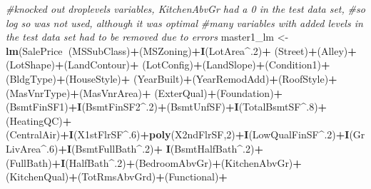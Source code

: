 \documentclass[]{article}
\newenvironment{Shaded}{\begin{snugshade}}{\end{snugshade}}
\newcommand{\CommentTok}[1]{\textcolor[rgb]{0.56,0.35,0.01}{\textit{#1}}}
\newcommand{\DecValTok}[1]{\textcolor[rgb]{0.00,0.00,0.81}{#1}}
\newcommand{\KeywordTok}[1]{\textcolor[rgb]{0.13,0.29,0.53}{\textbf{#1}}}
\newcommand{\NormalTok}[1]{#1}
\newcommand{\OperatorTok}[1]{\textcolor[rgb]{0.81,0.36,0.00}{\textbf{#1}}}
\newcommand{\StringTok}[1]{\textcolor[rgb]{0.31,0.60,0.02}{#1}}
\begin{document}
\begin{Shaded}
\begin{Highlighting}[]
\CommentTok{#knocked out droplevels variables, KitchenAbvGr had a 0 in the test data set,}
\CommentTok{#so log so was not used, although it was optimal}
\CommentTok{#many variables with added levels in the test data set had to be removed due to errors}
\NormalTok{master1_lm <-}\StringTok{ }\KeywordTok{lm}\NormalTok{(SalePrice}\OperatorTok{~}\NormalTok{(MSSubClass)}\OperatorTok{+}\NormalTok{(MSZoning)}\OperatorTok{+}\KeywordTok{I}\NormalTok{(LotArea}\OperatorTok{^}\NormalTok{.}\DecValTok{2}\NormalTok{)}\OperatorTok{+}\StringTok{ }\NormalTok{(Street)}\OperatorTok{+}\NormalTok{(Alley)}\OperatorTok{+}\NormalTok{(LotShape)}\OperatorTok{+}\NormalTok{(LandContour)}\OperatorTok{+}
\StringTok{    }\NormalTok{(LotConfig)}\OperatorTok{+}\NormalTok{(LandSlope)}\OperatorTok{+}\NormalTok{(Condition1)}\OperatorTok{+}\NormalTok{(BldgType)}\OperatorTok{+}\NormalTok{(HouseStyle)}\OperatorTok{+}
\StringTok{    }\NormalTok{(YearBuilt)}\OperatorTok{+}\NormalTok{(YearRemodAdd)}\OperatorTok{+}\NormalTok{(RoofStyle)}\OperatorTok{+}\NormalTok{(MasVnrType)}\OperatorTok{+}\NormalTok{(MasVnrArea)}\OperatorTok{+}
\StringTok{    }\NormalTok{(ExterQual)}\OperatorTok{+}\NormalTok{(Foundation)}\OperatorTok{+}\NormalTok{(BsmtFinSF1)}\OperatorTok{+}\KeywordTok{I}\NormalTok{(BsmtFinSF2}\OperatorTok{^}\NormalTok{.}\DecValTok{2}\NormalTok{)}\OperatorTok{+}\NormalTok{(BsmtUnfSF)}\OperatorTok{+}\KeywordTok{I}\NormalTok{(TotalBsmtSF}\OperatorTok{^}\NormalTok{.}\DecValTok{8}\NormalTok{)}\OperatorTok{+}
\StringTok{    }\NormalTok{(HeatingQC)}\OperatorTok{+}\NormalTok{(CentralAir)}\OperatorTok{+}\KeywordTok{I}\NormalTok{(X1stFlrSF}\OperatorTok{^}\NormalTok{.}\DecValTok{6}\NormalTok{)}\OperatorTok{+}\KeywordTok{poly}\NormalTok{(X2ndFlrSF,}\DecValTok{2}\NormalTok{)}\OperatorTok{+}\KeywordTok{I}\NormalTok{(LowQualFinSF}\OperatorTok{^}\NormalTok{.}\DecValTok{2}\NormalTok{)}\OperatorTok{+}\KeywordTok{I}\NormalTok{(GrLivArea}\OperatorTok{^}\NormalTok{.}\DecValTok{6}\NormalTok{)}\OperatorTok{+}\KeywordTok{I}\NormalTok{(BsmtFullBath}\OperatorTok{^}\NormalTok{.}\DecValTok{2}\NormalTok{)}\OperatorTok{+}
\StringTok{    }\KeywordTok{I}\NormalTok{(BsmtHalfBath}\OperatorTok{^}\NormalTok{.}\DecValTok{2}\NormalTok{)}\OperatorTok{+}\NormalTok{(FullBath)}\OperatorTok{+}\KeywordTok{I}\NormalTok{(HalfBath}\OperatorTok{^}\NormalTok{.}\DecValTok{2}\NormalTok{)}\OperatorTok{+}\NormalTok{(BedroomAbvGr)}\OperatorTok{+}\NormalTok{(KitchenAbvGr)}\OperatorTok{+}\NormalTok{(KitchenQual)}\OperatorTok{+}\NormalTok{(TotRmsAbvGrd)}\OperatorTok{+}\NormalTok{(Functional)}\OperatorTok{+}

\end{Highlighting}
\end{Shaded}
\end{document}
